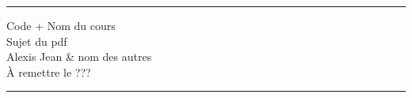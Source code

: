 \documentclass[11pt]{article}
\begin{document}
\hrule

\begin{center}
  {\Large Code + Nom du cours} \\ \vspace{5mm}
  {\LARGE\sffamily Sujet du pdf} \\
  Alexis Jean & nom des autres\\
  À remettre le ???
\end{center}

\hrule


\section{\underline{}}

\subsection{}
\end{document}
